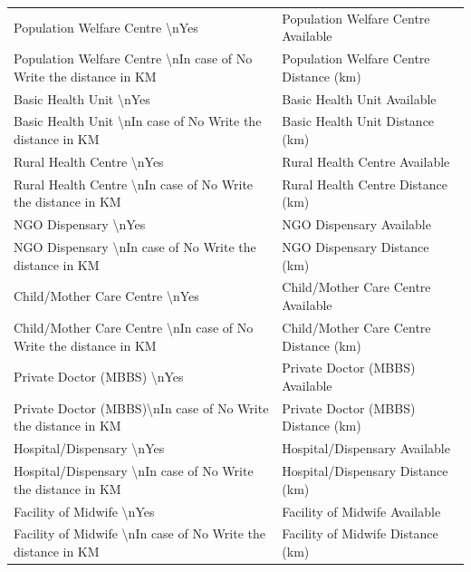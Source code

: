 \documentclass[10pt,a4paper]{article}
\begin{document}
\begin{longtable}{>{\raggedright\arraybackslash}p{7.5cm} >{\raggedright\arraybackslash}p{7.5cm}}
Population Welfare Centre \textbackslash nYes & Population Welfare Centre Available \\
Population Welfare Centre \textbackslash nIn case of No Write the distance in KM & Population Welfare Centre Distance (km) \\
Basic Health Unit \textbackslash nYes & Basic Health Unit Available \\
Basic Health Unit \textbackslash nIn case of No Write the distance in KM & Basic Health Unit Distance (km) \\
Rural Health Centre \textbackslash nYes & Rural Health Centre Available \\
Rural Health Centre \textbackslash nIn case of No Write the distance in KM & Rural Health Centre Distance (km) \\
NGO Dispensary \textbackslash nYes & NGO Dispensary Available \\
NGO Dispensary \textbackslash nIn case of No Write the distance in KM & NGO Dispensary Distance (km) \\
Child/Mother Care Centre \textbackslash nYes & Child/Mother Care Centre Available \\
Child/Mother Care Centre \textbackslash nIn case of No Write the distance in KM & Child/Mother Care Centre Distance (km) \\
Private Doctor (MBBS) \textbackslash nYes & Private Doctor (MBBS) Available \\
Private Doctor (MBBS)\textbackslash nIn case of No Write the distance in KM & Private Doctor (MBBS) Distance (km) \\
Hospital/Dispensary \textbackslash nYes & Hospital/Dispensary Available \\
Hospital/Dispensary \textbackslash nIn case of No Write the distance in KM & Hospital/Dispensary Distance (km) \\
Facility of Midwife \textbackslash nYes & Facility of Midwife Available \\
Facility of Midwife \textbackslash nIn case of No Write the distance in KM & Facility of Midwife Distance (km) \\


\end{longtable}
\end{document}
